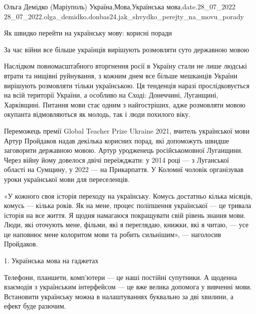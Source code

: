 
 
 
 
 

Ольга Демідко (Маріуполь)
Україна,Мова,Українська мова,date.28_07_2022
28_07_2022.olga_demidko.donbas24.jak_shvydko_perejty_na_movu_porady

Як швидко перейти на українську мову: корисні поради

За час війни все більше українців вирішують розмовляти суто державною мовою

Наслідком повномасштабного вторгнення росії в Україну стали не лише людські
втрати та нищівні руйнування, з кожним днем все більше мешканців України
вирішують розмовляти тільки українською. Ця тенденція наразі прослідковується
на всій території України, а особливо на Сході: Донеччині, Луганщині,
Харківщині. Питання мови стає одним з найгостріших, адже розмовляти мовою
окупанта відмовляються як молодь, так і люди похилого віку.

Переможець премії Global Teacher Prize Ukraine 2021, вчитель української мови
Артур Пройдаков надав декілька корисних порад, які допоможуть швидше заговорити
державною мовою. Артур уродженець російськомовної Луганщини. Через війну йому
довелося двічі переїжджати: у 2014 році — з Луганської області на Сумщину, у
2022 — на Прикарпаття. У Коломиї чоловік організував уроки української мови для
переселенців.

«У кожного своя історія переходу на українську. Комусь достатньо кілька
місяців, комусь — кілька років. Як на мене, процес поліпшення української — це
тривала історія на все життя. Я щодня намагаюся покращувати свій рівень знання
мови. Люди, які оточують мене, фільми, які я переглядаю, книжки, які я читаю, —
усе це наповнює мене колоритом мови та робить сильнішим», — наголосив
Пройдаков.

1. Українська мова на гаджетах

Телефони, планшети, комп'ютери — це наші постійні супутники. А щоденна
взаємодія з українським інтерфейсом — це вже велика допомога у вивченні мови.
Встановити українську можна в налаштуваннях буквально за дві хвилини, а ефект
буде разючим.


